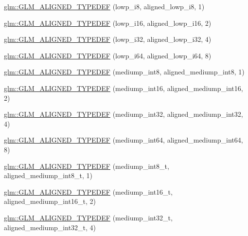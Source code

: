 \begin{DoxyCompactItemize}
\item 
\hyperlink{group__gtx__type__aligned_gac20d508d2ef5cc95ad3daf083c57ec2a}{glm\-::\-G\-L\-M\-\_\-\-A\-L\-I\-G\-N\-E\-D\-\_\-\-T\-Y\-P\-E\-D\-E\-F} (lowp\-\_\-i8, aligned\-\_\-lowp\-\_\-i8, 1)
\item 
\hyperlink{group__gtx__type__aligned_ga50257b48069a31d0c8d9c1f644d267de}{glm\-::\-G\-L\-M\-\_\-\-A\-L\-I\-G\-N\-E\-D\-\_\-\-T\-Y\-P\-E\-D\-E\-F} (lowp\-\_\-i16, aligned\-\_\-lowp\-\_\-i16, 2)
\item 
\hyperlink{group__gtx__type__aligned_gaa07e98e67b7a3435c0746018c7a2a839}{glm\-::\-G\-L\-M\-\_\-\-A\-L\-I\-G\-N\-E\-D\-\_\-\-T\-Y\-P\-E\-D\-E\-F} (lowp\-\_\-i32, aligned\-\_\-lowp\-\_\-i32, 4)
\item 
\hyperlink{group__gtx__type__aligned_ga62601fc6f8ca298b77285bedf03faffd}{glm\-::\-G\-L\-M\-\_\-\-A\-L\-I\-G\-N\-E\-D\-\_\-\-T\-Y\-P\-E\-D\-E\-F} (lowp\-\_\-i64, aligned\-\_\-lowp\-\_\-i64, 8)
\item 
\hyperlink{group__gtx__type__aligned_gac8cff825951aeb54dd846037113c72db}{glm\-::\-G\-L\-M\-\_\-\-A\-L\-I\-G\-N\-E\-D\-\_\-\-T\-Y\-P\-E\-D\-E\-F} (mediump\-\_\-int8, aligned\-\_\-mediump\-\_\-int8, 1)
\item 
\hyperlink{group__gtx__type__aligned_ga78f443d88f438575a62b5df497cdf66b}{glm\-::\-G\-L\-M\-\_\-\-A\-L\-I\-G\-N\-E\-D\-\_\-\-T\-Y\-P\-E\-D\-E\-F} (mediump\-\_\-int16, aligned\-\_\-mediump\-\_\-int16, 2)
\item 
\hyperlink{group__gtx__type__aligned_ga0680cd3b5d4e8006985fb41a4f9b57af}{glm\-::\-G\-L\-M\-\_\-\-A\-L\-I\-G\-N\-E\-D\-\_\-\-T\-Y\-P\-E\-D\-E\-F} (mediump\-\_\-int32, aligned\-\_\-mediump\-\_\-int32, 4)
\item 
\hyperlink{group__gtx__type__aligned_gad9e5babb1dd3e3531b42c37bf25dd951}{glm\-::\-G\-L\-M\-\_\-\-A\-L\-I\-G\-N\-E\-D\-\_\-\-T\-Y\-P\-E\-D\-E\-F} (mediump\-\_\-int64, aligned\-\_\-mediump\-\_\-int64, 8)
\item 
\hyperlink{group__gtx__type__aligned_ga353fd9fa8a9ad952fcabd0d53ad9a6dd}{glm\-::\-G\-L\-M\-\_\-\-A\-L\-I\-G\-N\-E\-D\-\_\-\-T\-Y\-P\-E\-D\-E\-F} (mediump\-\_\-int8\-\_\-t, aligned\-\_\-mediump\-\_\-int8\-\_\-t, 1)
\item 
\hyperlink{group__gtx__type__aligned_ga2196442c0e5c5e8c77842de388c42521}{glm\-::\-G\-L\-M\-\_\-\-A\-L\-I\-G\-N\-E\-D\-\_\-\-T\-Y\-P\-E\-D\-E\-F} (mediump\-\_\-int16\-\_\-t, aligned\-\_\-mediump\-\_\-int16\-\_\-t, 2)
\item 
\hyperlink{group__gtx__type__aligned_ga1284488189daf897cf095c5eefad9744}{glm\-::\-G\-L\-M\-\_\-\-A\-L\-I\-G\-N\-E\-D\-\_\-\-T\-Y\-P\-E\-D\-E\-F} (mediump\-\_\-int32\-\_\-t, aligned\-\_\-mediump\-\_\-int32\-\_\-t, 4)

\end{DoxyCompactItemize}
